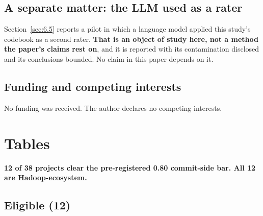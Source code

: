 \documentclass[sigconf,review,anonymous]{acmart}
\begin{document}
\subsection{A separate matter: the LLM used as a rater}
\label{sec:8.4}

Section~\ref{sec:6.5} reports a pilot in which a language model applied this study's codebook as a second rater. \textbf{That is an object of study here, not a method the paper's claims rest on}, and it is reported with its contamination disclosed and its conclusions bounded. No claim in this paper depends on it.

\subsection{Funding and competing interests}
\label{sec:8.5}

No funding was received. The author declares no competing interests.


\section*{Tables}




\textbf{12 of 38 projects clear the pre-registered 0.80 commit-side bar. All 12 are Hadoop-ecosystem.}



\subsection*{Eligible (12)}

\end{document}

